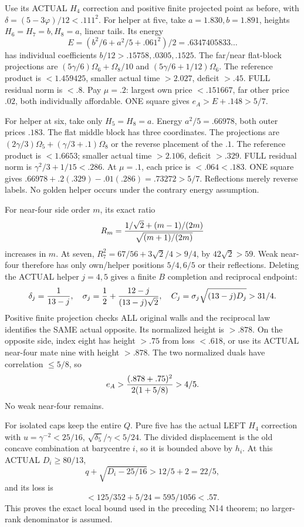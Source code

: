 Use its ACTUAL \(H_4\) correction and positive
finite projected point as before, with
\(\delta=(5-3\varphi)/12<.111^2\).
For helper at five, take
\(a=1.830,b=1.891\), heights
\(H_6=H_7=b,H_8=a\), linear tails.
Its energy
\[
                 E=(b^2/6+a^2/5+.061^2)/2=.6347405833\ldots
\]
has individual coefficients
\(b/12>.15758,.0305,.1525\).
The far/near flat-block projections are
\((5\gamma/6)\Omega_6+\Omega_8/10\) and
\((5\gamma/6+1/12)\Omega_6\).
The reference product is \(<1.459425\),
smaller actual time \(>2.027\), deficit \(>.45\).
FULL residual norm is \(<.8\).
Pay \(\mu=.2\): largest own price
\(<.151667\), far other price \(.02\),
both individually affordable.
ONE square gives \(e_A>E+.148>5/7\).

For helper at six, take only \(H_5=H_8=a\).
Energy \(a^2/5=.66978\), both outer prices \(.183\).
The flat middle block has three coordinates.
The projections are
\((2\gamma/3)\Omega_5+(\gamma/3+.1)\Omega_8\)
or the reverse placement of the \(.1\).
The reference product is \(<1.6653\);
smaller actual time \(>2.106\), deficit \(>.329\).
FULL residual norm is \(\gamma^2/3+1/15<.286\).
At \(\mu=.1\), each price is \(<.064<.183\).
ONE square gives
\(.66978+.2(.329)-.01(.286)=.73272>5/7\).
Reflections merely reverse labels.
No golden helper occurs under the contrary
energy assumption.

For near-four side order \(m\), its exact ratio
\[
 R_m={1/\sqrt2+(m-1)/(2m)\over\sqrt{(m+1)/(2m)}}
\]
increases in \(m\).
At seven,
\(R_7^2=67/56+3\sqrt2/4>9/4\), by \(42\sqrt2>59\).
Weak near-four therefore has only own/helper
positions \(5/4,6/5\) or their reflections.
Deleting the ACTUAL helper \(j=4,5\) gives a
finite \(B\) completion and reciprocal endpoint:
\[
 \delta_j={1\over13-j},\quad
 \sigma_j={1\over2}+{12-j\over(13-j)\sqrt2},\quad
 C_j=\sigma_j\sqrt{(13-j)D_j}>31/4.
\]
Positive finite projection checks ALL original
walls and the reciprocal law identifies the
SAME actual opposite.
Its normalized height is \(>.878\).
On the opposite side, index eight has height
\(>.75\) from loss \(<.618\), or use its ACTUAL
near-four mate nine with height \(>.878\).
The two normalized duals have correlation
\(\le5/8\), so
\[
                       e_A>{(.878+.75)^2\over2(1+5/8)}>4/5.
\]
No weak near-four remains.

For isolated caps keep the entire \(Q\).
Pure five has the actual LEFT \(H_4\)
correction with
\(u=\gamma^{-2}<25/16\),
\(\sqrt{\delta_5}/\gamma<5/24\).
The divided displacement is the old concave
combination at barycentre \(i\), so it is
bounded above by \(h_i\).
At this ACTUAL \(D_i\ge80/13\),
\[
 q+\sqrt{D_i-25/16}>12/5+2=22/5,
\]
and its loss is
\[
                    <125/352+5/24=595/1056<.57 .
\]
This proves the exact local bound used in
the preceding N14 theorem; no larger-rank
denominator is assumed.

